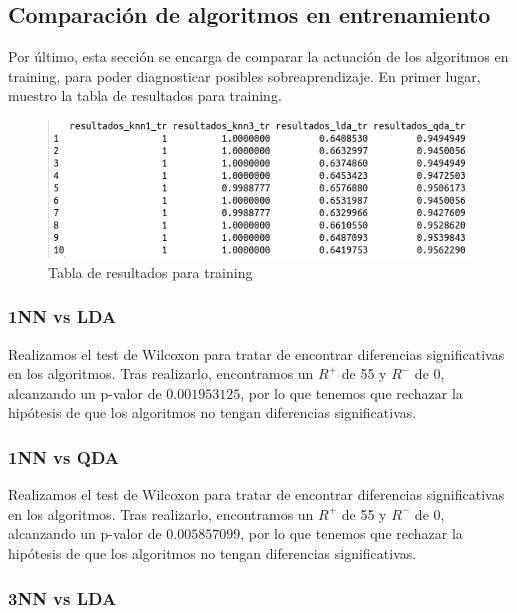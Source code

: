 \subsection{Comparación de algoritmos en entrenamiento}

Por último, esta sección se encarga de comparar la actuación de los algoritmos en training, para poder diagnosticar posibles sobreaprendizaje. En primer lugar, muestro la tabla de resultados para training.

\begin{figure}[H] %
	\centering
	\includegraphics[scale=0.6]{tabla-res-c-tr.png}  %
	\caption{Tabla de resultados para training} 
	\label{fig:res-c-tr}
\end{figure}

\subsubsection{1NN vs LDA}

Realizamos el test de Wilcoxon para tratar de encontrar diferencias significativas en los algoritmos. Tras realizarlo, encontramos un $R^{+}$ de 55 y $R^{-}$ de 0, alcanzando un p-valor de $0.001953125$, por lo que tenemos que rechazar la hipótesis de que los algoritmos no tengan diferencias significativas.

\subsubsection{1NN vs QDA}

Realizamos el test de Wilcoxon para tratar de encontrar diferencias significativas en los algoritmos. Tras realizarlo, encontramos un $R^{+}$ de 55 y $R^{-}$ de 0, alcanzando un p-valor de $0.005857099$, por lo que tenemos que rechazar la hipótesis de que los algoritmos no tengan diferencias significativas.

\subsubsection{3NN vs LDA}

